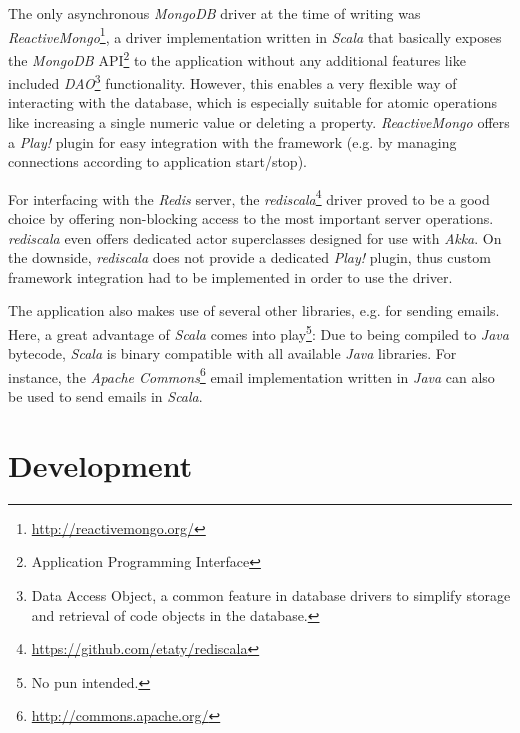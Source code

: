 The only asynchronous \textit{MongoDB} driver at the time of writing was \textit{ReactiveMongo}\footnote{\url{http://reactivemongo.org/}}, a driver implementation written in \textit{Scala} that basically exposes the \textit{MongoDB} API\footnote{Application Programming Interface} to the application without any additional features like included \textit{DAO}\footnote{Data Access Object, a common feature in database drivers to simplify storage and retrieval of code objects in the database.} functionality. However, this enables a very flexible way of interacting with the database, which is especially suitable for atomic operations like increasing a single numeric value or deleting a property. \textit{ReactiveMongo} offers a \textit{Play!} plugin for easy integration with the framework (e.g. by managing connections according to application start/stop).

For interfacing with the \textit{Redis} server, the \textit{rediscala}\footnote{\url{https://github.com/etaty/rediscala}} driver proved to be a good choice by offering non-blocking access to the most important server operations. \textit{rediscala} even offers dedicated actor superclasses designed for use with \textit{Akka}. On the downside, \textit{rediscala} does not provide a dedicated \textit{Play!} plugin, thus custom framework integration had to be implemented in order to use the driver.

The application also makes use of several other libraries, e.g. for sending emails. Here, a great advantage of \textit{Scala} comes 
into play\footnote{No pun intended.}: Due to being compiled to \textit{Java} bytecode, \textit{Scala} is binary compatible with all available \textit{Java} libraries. For instance, the \textit{Apache Commons}\footnote{\url{http://commons.apache.org/}} email implementation written in \textit{Java} can also be used to send emails in \textit{Scala}.

\section{Development}
\label{lab:impl-dev}
